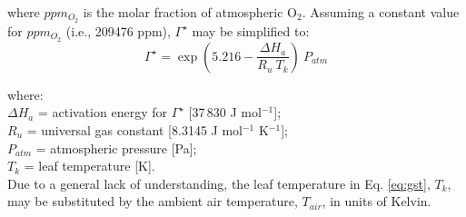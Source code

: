 \noindent where $ppm_{O_2}$ is the molar fraction of atmospheric O$_2$. Assuming a constant value for $ppm_{O_2}$ (i.e., 209476 ppm), $\Gamma^\star$ may be simplified to:
\begin{equation}
\label{eq:gstpb}
    \Gamma^\star = \exp \left(5.216 - \frac{\Delta H_a}{R_u\: T_k}\right)\: P_{atm}
\end{equation}

\noindent where:\\
\indent $\Delta H_a$ = activation energy for $\Gamma^\star$ [37$\,$830 J mol$^{-1}$];\\
\indent $R_u$ = universal gas constant [8.3145 J mol$^{-1}$ K$^{-1}$];\\
\indent $P_{atm}$ = atmospheric pressure [Pa];\\
\indent $T_k$ = leaf temperature [K].\\

\noindent Due to a general lack of understanding, the leaf temperature in Eq. \ref{eq:gst}, $T_k$, may be substituted by the ambient air temperature, $T_{air}$, in units of Kelvin. 

